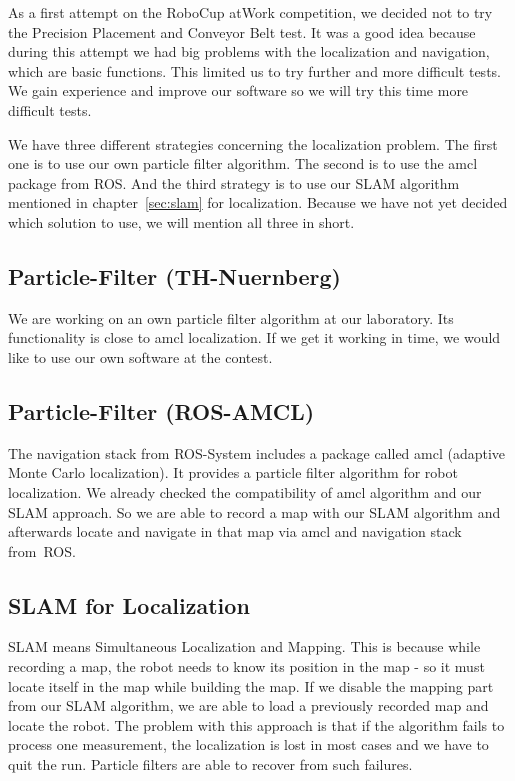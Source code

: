 As a first attempt on the RoboCup atWork  competition, we decided not to try the Precision Placement and Conveyor Belt test. It was a good idea because during this attempt we had big problems with the localization and navigation, which are basic functions. This limited us to try further and more difficult tests. We gain experience and improve our software so we will try this time more difficult tests.

We have three different strategies concerning the localization problem. The first one is to use our own particle filter algorithm. The second is to use the amcl package from ROS. And the third strategy is to use our SLAM algorithm mentioned in chapter~\ref{sec:slam} for localization. Because we have not yet decided which solution to use, we will mention all three in short.

\subsection{Particle-Filter (TH-Nuernberg)}
We are working on an own particle filter algorithm at our laboratory. Its functionality is close to amcl localization. If we get it working in time, we would like to use our own software at the contest.

\subsection{Particle-Filter (ROS-AMCL)}
The navigation stack from ROS-System includes a package called amcl (adaptive Monte Carlo localization). It provides a particle filter algorithm for robot localization. We already checked the compatibility of amcl algorithm and our SLAM approach. So we are able to record a map with our SLAM algorithm and afterwards locate and navigate in that map via amcl and navigation stack from~ROS.

\subsection{SLAM for Localization}
SLAM means Simultaneous Localization and Mapping. This is because while recording a map, the robot needs to know its position in the map - so it must locate itself in the map while building the map. If we disable the mapping part from our SLAM algorithm, we are able to load a previously recorded map and locate the robot. The problem with this approach is that if the algorithm fails to process one measurement, the localization is lost in most cases and we have to quit the run. Particle filters are able to recover from such failures.


